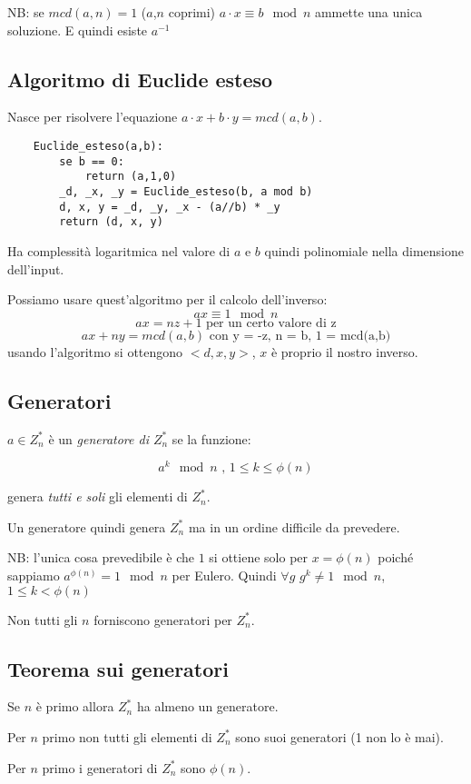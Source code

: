 NB: se $mcd(a,n)=1$ ($a$,$n$ coprimi) $a \cdot x \equiv b \mod n$ ammette una unica soluzione. E quindi esiste $a^{-1}$


\subsection{Algoritmo di Euclide esteso}
Nasce per risolvere l'equazione $a \cdot x + b \cdot y = mcd(a,b)$.
\begin{verbatim}
    Euclide_esteso(a,b):
        se b == 0:
            return (a,1,0)
        _d, _x, _y = Euclide_esteso(b, a mod b)
        d, x, y = _d, _y, _x - (a//b) * _y
        return (d, x, y)
\end{verbatim}
Ha complessità logaritmica nel valore di $a$ e $b$ quindi polinomiale nella dimensione dell'input.

Possiamo usare quest'algoritmo per il calcolo dell'inverso:
$$ ax \equiv 1 \mod n $$
$$ ax = nz + 1 \text{ per un certo valore di z} $$
$$ ax + ny = mcd(a,b) \text{ con y = -z, n = b, 1 = mcd(a,b)} $$
usando l'algoritmo si ottengono $<d, x, y>$, $x$ è proprio il nostro inverso.

\subsection{Generatori}
$a \in Z_{n}^*$ è un \emph{generatore di $Z_{n}^*$} se la funzione:

$$ a^k \mod n \text{ , } 1 \leq k \leq \phi(n) $$

genera \emph{tutti e soli} gli elementi di $Z_{n}^*$.

Un generatore quindi genera $Z_{n}^*$ ma in un ordine difficile da prevedere.

NB: l'unica cosa prevedibile è che $1$ si ottiene solo per $x = \phi(n)$ poiché sappiamo $a^{\phi(n)} = 1 \mod n$ per Eulero. Quindi $\forall g$ $g^k \neq 1 \mod n$, $ 1 \leq k < \phi(n)$

Non tutti gli $n$ forniscono generatori per $Z_{n}^*$.

\subsection{Teorema sui generatori}
Se $n$ è primo allora $Z_{n}^*$ ha almeno un generatore.

Per $n$ primo non tutti gli elementi di $Z_n^*$ sono suoi generatori (1 non lo è mai).

Per $n$ primo i generatori di $Z_n^*$ sono $\phi(n)$.

